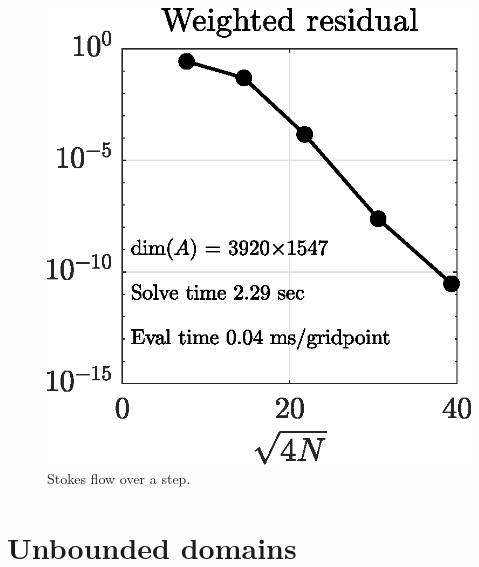 \begin{example}
\begin{figure}[H]
	\vspace{2em}
	\includegraphics[width=0.4\linewidth]{Figures/step_conv}

	\caption{Stokes flow over a step.}
	\label{fig:step}
\end{figure} 
\end{example}

\section{Unbounded domains \label{sec:unbounded}}


